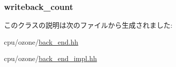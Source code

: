 \label{classBackEnd_ae4b76f4612be07d13b349e13ee9dfa16}
\hypertarget{classBackEnd_a1b89675ac5b779ab9ead5ae5d3550189}{
\subsubsection[{writeback\_\-count}]{ {\bf writeback\_\-count}}}
\label{classBackEnd_a1b89675ac5b779ab9ead5ae5d3550189}


このクラスの説明は次のファイルから生成されました:\begin{DoxyCompactItemize}
\item 
cpu/ozone/\hyperlink{back__end_8hh}{back\_\-end.hh}\item 
cpu/ozone/\hyperlink{back__end__impl_8hh}{back\_\-end\_\-impl.hh}\end{DoxyCompactItemize}
